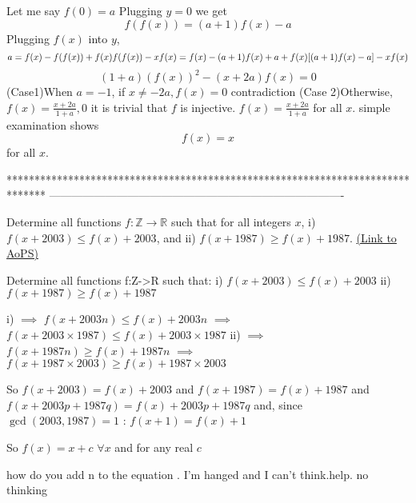 \begin{solution}
	Let me say $f(0)=a$
Plugging $y=0$ we get \[f(f(x))=(a+1)f(x)-a\]
Plugging $f(x)$ into $y$, \[a=f(x)-f(f(x))+f(x)f(f(x))-xf(x)\\
=f(x)-(a+1)f(x)+a+f(x)[(a+1)f(x)-a]-xf(x)\]
\[(1+a)(f(x))^2-(x+2a)f(x)=0\]
(Case1)When $a=-1$, if $x\neq -2a, f(x)=0$ contradiction
(Case 2)Otherwise, $f(x)=\frac{x+2a}{1+a},0$
it is trivial that $f$ is injective. $f(x)=\frac{x+2a}{1+a}$ for all $x$. simple examination shows
\[f(x)=x\]
for all $x$.
\end{solution}
*******************************************************************************
-------------------------------------------------------------------------------

\begin{problem}
	Determine all functions $f: \mathbb Z \to \mathbb R$ such that for all integers $x$,
i) $f(x+2003) \leq f(x)+2003$, and 
ii) $f(x+1987) \geq f(x)+1987$.
	\flushright \href{https://artofproblemsolving.com/community/c6h448115}{(Link to AoPS)}
\end{problem}



\begin{solution}
	\begin{tcolorbox}Determine all functions f:Z->R such that:
i) $f(x+2003)\le f(x)+2003$
ii) $f(x+1987)\ge f(x)+1987$\end{tcolorbox}

i) $\implies$ $f(x+2003n)\le f(x)+2003n$ $\implies$ $f(x+2003\times 1987)\le f(x)+2003\times 1987$
ii) $\implies$ $f(x+1987n)\ge f(x)+1987n$ $\implies$ $f(x+1987\times 2003)\ge f(x)+1987\times 2003$

So $f(x+2003)=f(x)+2003$ and $f(x+1987)=f(x)+1987$ and $f(x+2003p+1987q)=f(x)+2003p+1987q$ and, since $\gcd(2003,1987)=1$ : $f(x+1)=f(x)+1$

So $\boxed{f(x)=x+c}$ $\forall x$ and for any real $c$
\end{solution}



\begin{solution}
	how do you add n to the equation . I'm hanged and I can't think.help. no thinking
\end{solution}



